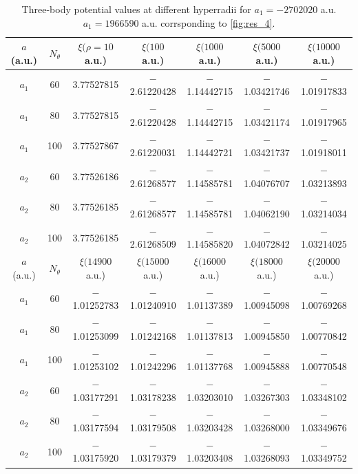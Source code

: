 \begin{table}[h!]
	\centering
	\footnotesize
	\begin{adjustwidth}{-0.1cm}{}
		\tabcolsep=0.10cm
		\begin{tabular}{||c c c c c c c||} 
			\hline
			$a$ (a.u.) & $N_{\theta}$ & $\xi(\rho = 10 $ a.u.) & $\xi(100 $ a.u.) & $\xi(1000 $ a.u.) & $\xi(5000 $ a.u.) & $\xi(10000 $ a.u.)  \Tstrut\Bstrut \\ [0.7ex]
			\hline\hline
			$a_1$   & 60  & 3.77527815 & $-$2.61220428 & $-$1.14442715 & $-$1.03421746 & $-$1.01917833 \\
			$a_1$   & 80  & 3.77527815 & $-$2.61220428 & $-$1.14442715 & $-$1.03421174 & $-$1.01917965 \\
			$a_1$   & 100  & 3.77527867 & $-$2.61220031 & $-$1.14442721 & $-$1.03421737 & $-$1.01918011 \\
			$a_2$   & 60  & 3.77526186 & $-$2.61268577 & $-$1.14585781 & $-$1.04076707 & $-$1.03213893 \\
			$a_2$   & 80  & 3.77526185 & $-$2.61268577 & $-$1.14585781 & $-$1.04062190 & $-$1.03214034 \\
			$a_2$   & 100  & 3.77526185 & $-$2.61268509 & $-$1.14585820 & $-$1.04072842 & $-$1.03214025 \\ [1ex] 
			\hline
			\hline
			$a$ (a.u.) & $N_{\theta}$ & $\xi(14900 $ a.u.) & $\xi(15000 $ a.u.) & $\xi(16000 $ a.u.) & $\xi(18000 $ a.u.) & $\xi(20000 $ a.u.)  \Tstrut\Bstrut \\ [0.7ex]
			\hline\hline
			$a_1$   & 60  & $-$1.01252783 & $-$1.01240910 & $-$1.01137389 & $-$1.00945098 & $-$1.00769268   \\
			$a_1$   & 80 & $-$1.01253099 & $-$1.01242168 & $-$1.01137813 & $-$1.00945850 & $-$1.00770842 \\
			$a_1$   & 100  & $-$1.01253102 & $-$1.01242296 & $-$1.01137768 & $-$1.00945888 & $-$1.00770548 \\
			$a_2$   & 60 & $-$1.03177291 & $-$1.03178238 & $-$1.03203010 & $-$1.03267303 & $-$1.03348102  \\
			$a_2$   & 80  & $-$1.03177594 & $-$1.03179508 & $-$1.03203428 & $-$1.03268000 & $-$1.03349676 \\
			$a_2$   & 100 & $-$1.03175920 & $-$1.03179379 & $-$1.03203408 & $-$1.03268093 & $-$1.03349752  \\ [1ex] 
			\hline
		\end{tabular}
	\end{adjustwidth}
	\caption{Three-body potential values at different hyperradii for $a_1 = -2702020$ a.u. $a_1 = 1966590$ a.u. corrsponding to \cref{fig:res_4}.}
	\label{table:Res_2}
\end{table} 

